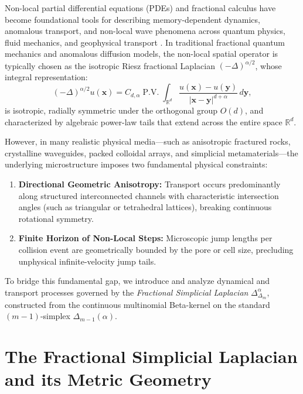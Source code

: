 \documentclass[11pt,a4paper]{article}
\theoremstyle{plain}
\theoremstyle{definition}
\theoremstyle{remark}
\numberwithin{equation}{section}
\begin{document}
Non-local partial differential equations (PDEs) and fractional calculus have become foundational tools for describing memory-dependent dynamics, anomalous transport, and non-local wave phenomena across quantum physics, fluid mechanics, and geophysical transport \cite{podlubny1998, samko1993, metzler2000, laskin2000}. In traditional fractional quantum mechanics and anomalous diffusion models, the non-local spatial operator is typically chosen as the isotropic Riesz fractional Laplacian $(-\Delta)^{\alpha/2}$, whose integral representation:
\begin{equation}
(-\Delta)^{\alpha/2} u(\mathbf{x}) = C_{d, \alpha} \operatorname{P.V.} \int_{\mathbb{R}^d} \frac{u(\mathbf{x}) - u(\mathbf{y})}{|\mathbf{x} - \mathbf{y}|^{d+\alpha}} \, d\mathbf{y},
\end{equation}
is isotropic, radially symmetric under the orthogonal group $O(d)$, and characterized by algebraic power-law tails that extend across the entire space $\mathbb{R}^d$.

However, in many realistic physical media—such as anisotropic fractured rocks, crystalline waveguides, packed colloidal arrays, and simplicial metamaterials—the underlying microstructure imposes two fundamental physical constraints:
\begin{enumerate}
    \item \textbf{Directional Geometric Anisotropy:} Transport occurs predominantly along structured interconnected channels with characteristic intersection angles (such as triangular or tetrahedral lattices), breaking continuous rotational symmetry.
    \item \textbf{Finite Horizon of Non-Local Steps:} Microscopic jump lengths per collision event are geometrically bounded by the pore or cell size, precluding unphysical infinite-velocity jump tails.
\end{enumerate}

To bridge this fundamental gap, we introduce and analyze dynamical and transport processes governed by the \emph{Fractional Simplicial Laplacian} $\Delta_{\Delta_m}^\alpha$, constructed from the continuous multinomial Beta-kernel on the standard $(m-1)$-simplex $\Delta_{m-1}(\alpha)$.

\section{The Fractional Simplicial Laplacian and its Metric Geometry}
\end{document}
